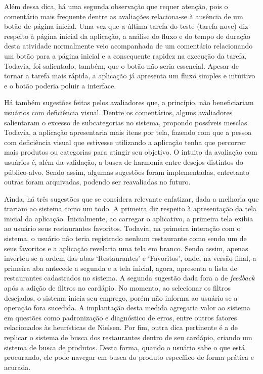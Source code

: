Além dessa dica, há uma segunda observação que requer atenção, pois o comentário mais frequente dentre as avaliações relaciona-se à ausência de um botão de página inicial. Uma vez que a última tarefa do teste (tarefa nove) diz respeito à página inicial da aplicação, a análise do fluxo e do tempo de duração desta atividade normalmente veio acompanhada de um comentário relacionando um botão para a página inicial e a consequente rapidez na execução da tarefa. Todavia, foi salientado, também, que o botão não seria essencial. Apesar de tornar a tarefa mais rápida, a aplicação já apresenta um fluxo simples e intuitivo e o botão poderia poluir a interface.

Há também sugestões feitas pelos avaliadores que, a princípio, não beneficiariam usuários com deficiência visual. Dentre os comentários, alguns avaliadores salientaram o excesso de subcategorias no sistema, propondo possíveis mesclas. Todavia, a aplicação apresentaria mais itens por tela, fazendo com que a pessoa com deficiência visual que estivesse utilizando a aplicação tenha que percorrer mais produtos ou categorias para atingir seu objetivo. O intuito da avaliação com usuários é, além da validação, a busca de harmonia entre desejos distintos do público-alvo. Sendo assim, algumas sugestões foram implementadas, entretanto outras foram arquivadas, podendo ser reavaliadas no futuro.

Ainda, há três sugestões que se considera relevante enfatizar, dada a melhoria que trariam ao sistema como um todo. A primeira diz respeito à apresentação da tela inicial da aplicação. Inicialmente, ao carregar o aplicativo, a primeira tela exibia ao usuário seus restaurantes favoritos. Todavia, na primeira interação com o sistema, o usuário não teria registrado nenhum restaurante como sendo um de seus favoritos e a aplicação revelaria uma tela em branco. Sendo assim, apenas inverteu-se a ordem das abas ‘Restaurantes’ e ‘Favoritos’, onde, na versão final, a primeira aba antecede a segunda e a tela inicial, agora, apresenta a lista de restaurantes cadastrados no sistema. A segunda sugestão dada fora a de \emph{feedback} após a adição de filtros no cardápio. No momento, ao selecionar os filtros desejados, o sistema inicia seu emprego, porém não informa ao usuário se a operação fora sucedida. A implantação desta medida agregaria valor ao sistema em questões como padronização e diagnóstico de erros, entre outros fatores relacionados às heurísticas de Nielsen. Por fim, outra dica pertinente é a de replicar o sistema de busca dos restaurantes dentro de seu cardápio, criando um sistema de busca de produtos. Desta forma, quando o usuário sabe o que está procurando, ele pode navegar em busca do produto específico de forma prática e acurada.